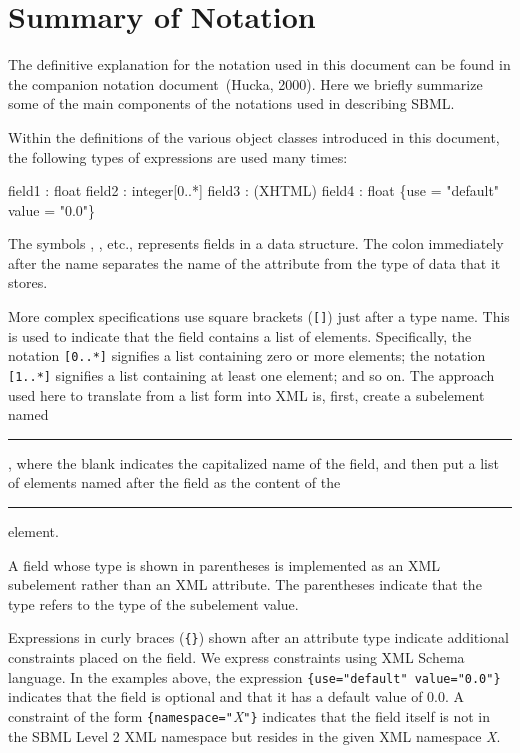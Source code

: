 \documentclass[10pt,twocolumntoc]{cekarticle}
\begin{document}
\section{Summary of Notation}
\label{apdx:notation}

The definitive explanation for the notation used in this document can be
found in the companion notation document~(Hucka, 2000).  Here we briefly
summarize some of the main components of the notations used in describing
SBML.

Within the definitions of the various object classes introduced in this
document, the following types of expressions are used many times:

\begin{example}
  field1 : float
  field2 : integer[0..*]
  field3 : (XHTML)
  field4 : float \{use = "default" value = "0.0"\}
\end{example}

The symbols , , etc., represents fields in a
data structure.  The colon immediately after the name separates the name of
the attribute from the type of data that it stores.

More complex specifications use square brackets (\texttt{[]}) just after a
type name.  This is used to indicate that the field contains a list of
elements.  Specifically, the notation \texttt{[0..*]} signifies a list
containing zero or more elements; the notation \texttt{[1..*]} signifies a
list containing at least one element; and so on.  The approach used here to
translate from a list form into XML is, first, create a subelement named
\rule{0.5in}{0.5pt}, where the blank indicates the
capitalized name of the field, and then put a list of elements named after
the field as the content of the \rule{0.5in}{0.5pt}
element.

A field whose type is shown in parentheses is implemented as an
XML subelement rather than an XML attribute.  The parentheses
indicate that the type refers to the type of the subelement value.

Expressions in curly braces (\texttt{\{\}}) shown after an
attribute type indicate additional constraints placed on the
field.  We express constraints using XML Schema language.  In the
examples above, the expression \texttt{\{use="default"
value="0.0"\}} indicates that the field  is
optional and that it has a default value of $0.0$.
A constraint of the form \texttt{\{namespace="}\emph{X}\texttt{"\}} indicates that the
field itself is not in the SBML Level 2 XML namespace but resides in the
given XML namespace \emph{X}.
\end{document}
